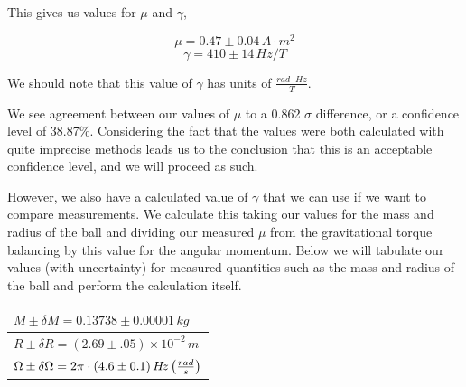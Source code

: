 \documentclass{article}
\DeclarePairedDelimiter{\parens}{\lparen}{\rparen}
\begin{document}
	\vspace{.25cm}

	This gives us values for $\mu$ and $\gamma$,

	$$\boxed{\mu = 0.47 \pm 0.04 \, A \cdot m^2}$$
	$$\boxed{\gamma = 410 \pm 14 \, Hz/T}$$

	We should note that this value of $\gamma$ has units of $\frac{rad\cdot H\!z}{T}$.

	\vspace{.25cm}

	We see agreement between our values of $\mu$ to a 0.862 $\sigma$ difference, or a confidence level of 38.87\%.  Considering the fact that the values were both calculated with quite imprecise methods leads us to the conclusion that this is an acceptable confidence level, and we will proceed as such.

	\vspace{.25cm}

	However, we also have a calculated value of $\gamma$ that we can use if we want to compare measurements.  We calculate this taking our values for the mass and radius of the ball and dividing our measured $\mu$ from the gravitational torque balancing by this value for the angular momentum.  Below we will tabulate our values (with uncertainty) for measured quantities such as the mass and radius of the ball and perform the calculation itself.

	\begin{center}
	\begin{tabular}{|l|}
		\hline
		$M \pm \delta M = 0.13738 \pm 0.00001 \, kg$ \\ \hline
		$R \pm \delta R = (2.69 \pm .05)\times 10^{-2} \, m$ \\ \hline
		$\Omega \pm \delta \Omega = 2\pi \cdot \parens{4.6 \pm 0.1} \, H\!z \, \big{(}\frac{rad}{s}\big{)}$ \\ \hline
	\end{tabular}
	\end{center}
\end{document}
